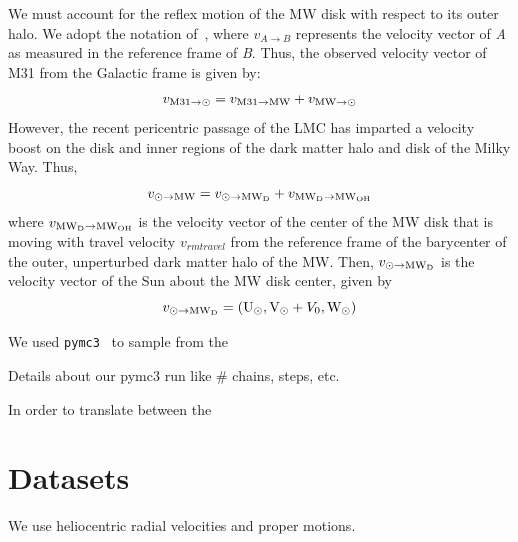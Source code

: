 \documentclass[twocolumn]{aastex631}
\begin{document}
We must account for the reflex motion of the MW disk with respect to its outer halo. We adopt the notation of~\cite{Penarrubia2016}, where $v_{A\to B}$ represents the velocity vector of \textit{A} as measured in the reference frame of \textit{B}. Thus, the observed velocity vector of M31 from the Galactic frame is given by:
\begin{equation}
  v_{\rm M31 \to \odot} = v_{\rm M31 \to \rm MW} + 
                          v_{\rm MW \to \rm \odot}
\end{equation}
However, the recent pericentric passage of the LMC has imparted a velocity boost on the disk and inner regions of the dark matter halo and disk of the Milky Way. Thus,
\begin{equation}
  v_{\odot \to \rm MW} = v_{\odot \to \rm MW_{D}} + v_{\rm MW_{D}\to \rm MW_{OH}} 
\end{equation}
where $v_{\rm MW_{D}\to \rm MW_{OH}}$ is the velocity vector of the center of the MW disk that is moving with travel velocity $v_{rm travel}$ from the reference frame of the barycenter of the outer, unperturbed dark matter halo of the MW.
Then, $v_{\odot \to \rm MW_{D}}$ is the velocity vector of the Sun about the MW disk center, given by 
\begin{equation}
  v_{\odot \to \rm MW_{D}}=({\rm U}_\odot, {\rm V}_\odot + V_0, {\rm W}_\odot)  
\end{equation}



We used \texttt{pymc3}~\citep{Salvatier2016} to sample from the 

Details about our pymc3 run like \# chains, steps, etc.




In order to translate between the 






\section{Datasets}
We use heliocentric radial velocities and proper motions. 
\end{document}
